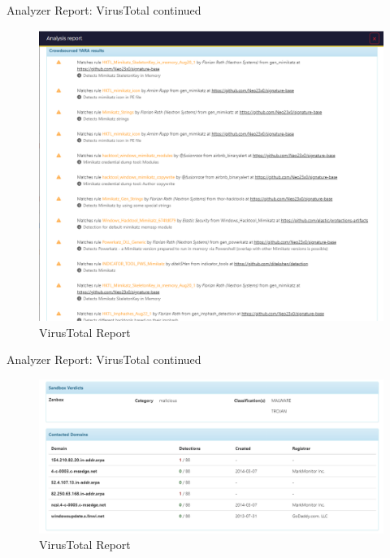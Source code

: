 \begin{frame}{Analyzer Report: VirusTotal continued}
 \begin{figure}[htp]
    \centering
    \includegraphics[scale=0.2]{virusTotal-2.png}
    \caption{VirusTotal Report}
    \label{fig:virusTotal-2}
\end{figure}
\end{frame}

\begin{frame}{Analyzer Report: VirusTotal continued}
 \begin{figure}[htp]
    \centering
    \includegraphics[scale=0.4]{virusTotal-3.png}
    \caption{VirusTotal Report}
    \label{fig:virusTotal-3}
\end{figure}

\end{frame}

